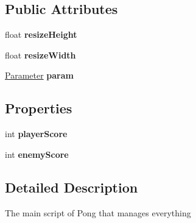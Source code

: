 \subsection*{Public Attributes}
\begin{DoxyCompactItemize}
\item 
\hypertarget{class_pong_manager_script_a55593ecdefaf33258fa1299d79da1908}{float {\bfseries resize\-Height}}\label{class_pong_manager_script_a55593ecdefaf33258fa1299d79da1908}

\item 
\hypertarget{class_pong_manager_script_a9e5c66d830ac0c59cdb60399395468e8}{float {\bfseries resize\-Width}}\label{class_pong_manager_script_a9e5c66d830ac0c59cdb60399395468e8}

\item 
\hypertarget{class_pong_manager_script_acb8353081df4087e1d62bc27477641c2}{\hyperlink{class_parameter}{Parameter} {\bfseries param}}\label{class_pong_manager_script_acb8353081df4087e1d62bc27477641c2}

\end{DoxyCompactItemize}
\subsection*{Properties}
\begin{DoxyCompactItemize}
\item 
\hypertarget{class_pong_manager_script_a35ff52e03c34e978f27739997dfbe673}{int {\bfseries player\-Score}}\label{class_pong_manager_script_a35ff52e03c34e978f27739997dfbe673}

\item 
\hypertarget{class_pong_manager_script_a3f73117317002dab104bbe8633b1f302}{int {\bfseries enemy\-Score}}\label{class_pong_manager_script_a3f73117317002dab104bbe8633b1f302}

\end{DoxyCompactItemize}


\subsection{Detailed Description}
The main script of Pong that manages everything 



